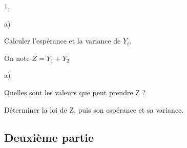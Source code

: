 \documentclass[11pt]{article}%
\begin{document}
\begin{noliste}{1.}
\begin{noliste}{a)}
\item Calculer l'espérance et la variance de $Y_{i}$.
\end{noliste}

\item On note $Z = Y_{1} + Y_{2}$

\begin{noliste}{a)}
 \setlength{\itemsep}{2mm}
\item Quelles sont les valeurs que peut prendre Z ?

\item Déterminer la loi de Z, puis son espérance et sa variance.
\end{noliste}
\end{noliste}

\subsection*{Deuxième partie}
\end{document}
